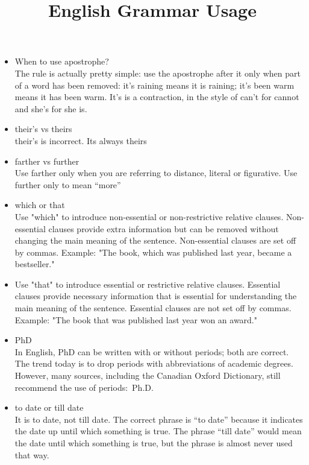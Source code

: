 \documentclass{../template/texnote}
\title{English Grammar Usage}
\begin{document}
    \maketitle {}
	\begin{itemize}
		\item When to use apostrophe?\\
The rule is actually pretty simple: use the apostrophe after it only when part of a word has been removed: it's raining means it is raining; it's been warm means it has been warm. It's is a contraction, in the style of can't for cannot and she's for she is.

\item their's vs theirs \\
their's is incorrect. Its always theirs

\item farther vs further \\
Use farther only when you are referring to distance, literal or figurative. Use further only to mean “more”

\item which or that \\
Use "which" to introduce non-essential or non-restrictive relative clauses. Non-essential clauses provide extra information but can be removed without changing the main meaning of the sentence. Non-essential clauses are set off by commas. Example: "The book, which was published last year, became a bestseller."

\item Use "that" to introduce essential or restrictive relative clauses. Essential clauses provide necessary information that is essential for understanding the main meaning of the sentence. Essential clauses are not set off by commas. Example: "The book that was published last year won an award."

\item PhD \\
In English, PhD can be written with or without periods; both are correct. The trend today is to drop periods with abbreviations of academic degrees. However, many sources, including the Canadian Oxford Dictionary, still recommend the use of periods: Ph.D.

\item to date or till date \\
It is to date, not till date. The correct phrase is ``to date'' because it indicates the date up until which something is true. The phrase ``till date'' would mean the date until which something is true, but the phrase is almost never used that way.


\end{itemize}
\end{document}
